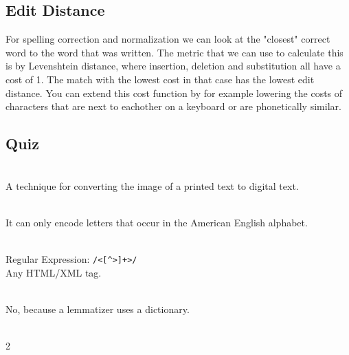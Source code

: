 \subsection{Edit Distance}

For spelling correction and normalization we can look at the
"closest" correct word
to the word that was written. The metric that we can use to calculate
this is by Levenshtein distance, where insertion, deletion and substitution
all have a cost of 1. The match with the lowest cost in that case has
the lowest edit distance.
You can extend this cost function by for example lowering the costs of
characters that are next to eachother on a keyboard or are phonetically
similar.

\subsection{Quiz}

\begin{quiz}
  ~\\
  A technique for converting the image of a printed text to digital text.
\end{quiz}

\begin{quiz}
  ~\\
  It can only encode letters that occur in the American English alphabet.
\end{quiz}

\begin{quiz}
  ~\\
  Regular Expression: \verb|/<[^>]+>/| \\
  Any HTML/XML tag.
\end{quiz}

\begin{quiz}
  ~\\
  No, because a lemmatizer uses a dictionary.
\end{quiz}

\begin{quiz}
  ~\\
  2
\end{quiz}
